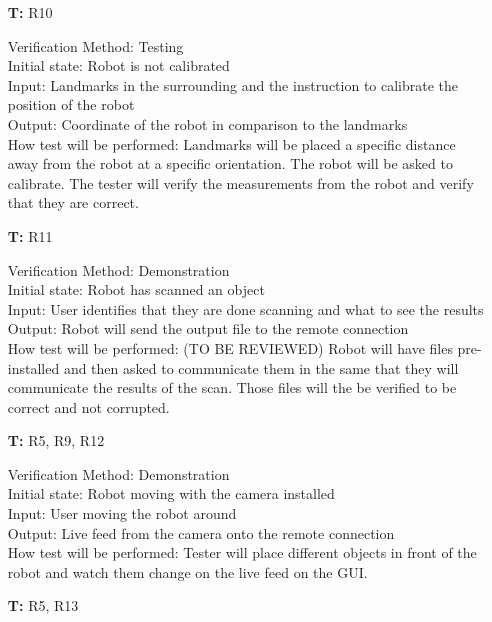 \documentclass[12pt, titlepage]{article}
\newcounter{tnum} %
\begin{document}
\begin{itemize}
\item[\textbf{T\refstepcounter{tnum}\thetnum:}]{R10\\}

Verification Method: Testing\\
Initial state: Robot is not calibrated \\
Input: Landmarks in the surrounding and the instruction to calibrate the position of the robot \\
Output: Coordinate of the robot in comparison to the landmarks\\
How test will be performed: Landmarks will be placed a specific distance away from the robot at a specific orientation. The robot will be asked to calibrate. The tester will verify the measurements from the robot and verify that they are correct. \\

\item[\textbf{T\refstepcounter{tnum}\thetnum:}]{R11\\}

Verification Method: Demonstration\\
Initial state: Robot has scanned an object \\
Input: User identifies that they are done scanning and what to see the results \\
Output: Robot will send the output file to the remote connection  \\
How test will be performed: (TO BE REVIEWED) Robot will have files pre-installed and then asked to communicate them in the same that they will communicate the results of the scan. Those files will the be verified to be correct and not corrupted. \\

\item[\textbf{T\refstepcounter{tnum}\thetnum:}]{R5, R9, R12\\}

Verification Method: Demonstration\\
Initial state: Robot moving with the camera installed \\
Input: User moving the robot around \\
Output: Live feed from the camera onto the remote connection \\
How test will be performed: Tester will place different objects in front of the robot and watch them change on the live feed on the GUI.\\

\item[\textbf{T\refstepcounter{tnum}\thetnum:}]{R5, R13\\}


\end{itemize}
\end{document}
